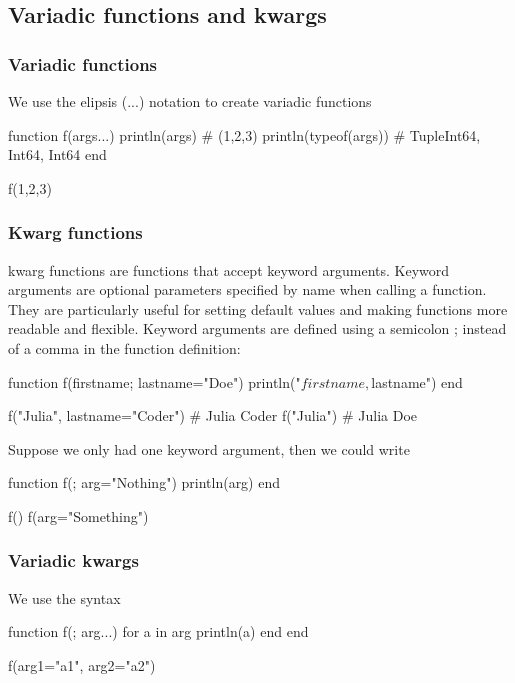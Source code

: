 \documentclass{report}
\begin{document}
    \bigbreak \noindent 
    \subsection{Variadic functions and kwargs}
    \bigbreak \noindent 
    \subsubsection{Variadic functions}
    \bigbreak \noindent 
    We use the elipsis (...) notation to create variadic functions
    \bigbreak \noindent 
    \begin{jlcode}
    function f(args...)
        println(args) # (1,2,3)
        println(typeof(args)) # Tuple{Int64, Int64, Int64}
    end

    f(1,2,3)
    \end{jlcode}

    \bigbreak \noindent 
    \subsubsection{Kwarg functions}
    \bigbreak \noindent 
    kwarg functions are functions that accept keyword arguments. Keyword arguments are optional parameters specified by name when calling a function. They are particularly useful for setting default values and making functions more readable and flexible.
    \bigbreak \noindent 
    Keyword arguments are defined using a semicolon ; instead of a comma in the function definition:
    \bigbreak \noindent 
    \begin{jlcode}
function f(firstname; lastname="Doe")
    println("$firstname, $lastname")
end

f("Julia", lastname="Coder") # Julia Coder
f("Julia") # Julia Doe
    \end{jlcode}
    \bigbreak \noindent 
    Suppose we only had one keyword argument, then we could write
    \bigbreak \noindent 
    \begin{jlcode}
        function f(; arg="Nothing")
            println(arg)
        end

        f()
        f(arg="Something")
    \end{jlcode}

    \bigbreak \noindent 
    \subsubsection{Variadic kwargs}
    \bigbreak \noindent 
    We use the syntax
    \bigbreak \noindent 
    \begin{jlcode}
        function f(; arg...)
            for a in arg
                println(a)
            end
        end

        f(arg1="a1", arg2="a2")
    \end{jlcode}
\end{document}
